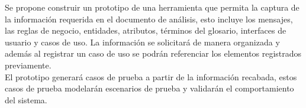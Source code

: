 Se propone construir un prototipo de una herramienta que permita la captura de la información requerida en el documento de análisis, 
esto incluye los mensajes, las reglas de negocio, entidades, atributos, términos del glosario, interfaces de usuario y casos de uso. La información se solicitará de 
manera organizada y además al registrar un caso de uso se podrán referenciar los elementos registrados previamente.\\

El prototipo generará casos de prueba a partir de la información recabada, estos casos de prueba modelarán escenarios 
de prueba y validarán el comportamiento del sistema. \\


